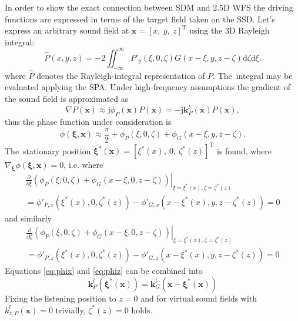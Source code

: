 \documentclass[12pt,a4paper]{article}
\newcommand{\td}{\mathrm{d}}
\newcommand{\ti}{\mathrm{j}}
\newcommand{\vx}{\mathbf{x}}
\newcommand{\vxi}{\bm{\xi}}
\newcommand{\vk}{\mathbf{k}}
\begin{document}
In order to show the exact connection between SDM and 2.5D WFS the driving functions are expressed in terms of the target field taken on the SSD.
Let's express an arbitrary sound field at $\vx = [x,\ y,\ z]^{\mathrm{T}}$ using the 3D Rayleigh integral:
\begin{equation}
\hat{P}(x,y,z) = -2 \iint_{-\infty}^{\infty} P'_y(\xi,0,\zeta) G(x-\xi,y,z-\zeta) \td \zeta \td \xi.
\end{equation}
%
where $\hat{P}$ denotes the Rayleigh-integral representation of $P$.
The~integral may be evaluated applying the SPA.
Under high-frequency assumptions the gradient of the sound field is approximated as
\begin{equation}
\nabla P(\vx) \approx \ti \phi_P(\vx) P(\vx) = -\ti \vk_P^l(\vx) P(\vx),
\end{equation}
%
thus the phase function under consideration is
%
\begin{equation}
\phi(\vxi,\vx) \approx \frac{\pi}{2} + \phi_P(\xi,0,\zeta) + \phi_G(x-\xi,y,z-\zeta).
\label{eq:Rayleigh_phase}
\end{equation}
%
The~stationary position
$\vxi^*(\vx) = [\xi^*(x),\ 0,\ \zeta^*(z)]^{\mathrm{T}}$
is found, where
$\nabla_{\vxi} \phi(\vxi,\vx) = 0$,
i.e. where
\begin{eqnarray}
\left.
\frac{\partial}{\partial \xi} \left( \phi_P(\xi,0,\zeta) + \phi_G(x-\xi,0,z-\zeta) \right)\right|_{\xi = \xi^*(x), \zeta = \zeta^*(z)} \nonumber \\
=
\phi'_{P,x}(\xi^*(x),0,\zeta^*(z)) - \phi'_{G,x}(x-\xi^*(x),y,z-\zeta^*(z)) = 0
\label{eq:phix}
\end{eqnarray}
%
and similarly
%
\begin{eqnarray}
\left. \frac{\partial}{\partial \zeta} \left( \phi_P(\xi,0,\zeta) + \phi_G(x-\xi,0,z-\zeta) \right)\right|_{\xi = \xi^*(x), \zeta = \zeta^*(z)} \nonumber \\
=
\phi'_{P,z}(\xi^*(x),0,\zeta^*(z)) - \phi'_{G,z}(x-\xi^*(x),y,z-\zeta^*(z)) = 0
\label{eq:phiz}
\end{eqnarray}
%
Equations \eqref{eq:phix} and \eqref{eq:phiz} can be combined into
%
\begin{equation}
\vk^l_P(\vxi^*(\vx)) = \vk^l_G(\vx - \vxi^*(\vx))
\label{eq:rayleigh_stat_point}
\end{equation}
%
Fixing the listening position to $z=0$ and for virtual sound fields with $k^l_{z,P}(\vx) = 0$ trivially, $\zeta^*(z) = 0$ holds.
\end{document}

